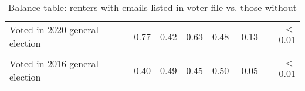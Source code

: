 \begin{table}[H]
{\begin{tabular}[t]{lrrrrrr}
Voted in 2020 general election & 0.77 & 0.42 & 0.63 & 0.48 & -0.13 & $<$0.01\\
\cellcolor[HTML]{D3D3D3}{Voted in 2017 municipal election} & \cellcolor[HTML]{D3D3D3}{0.09} & \cellcolor[HTML]{D3D3D3}{0.29} & \cellcolor[HTML]{D3D3D3}{0.11} & \cellcolor[HTML]{D3D3D3}{0.31} & \cellcolor[HTML]{D3D3D3}{0.02} & \cellcolor[HTML]{D3D3D3}{$<$0.01}\\
Voted in 2016 general election & 0.40 & 0.49 & 0.45 & 0.50 & 0.05 & $<$0.01\\
\bottomrule
\end{tabular}}
\caption{Balance table: renters with emails listed in voter file vs. those without}
\end{table}
